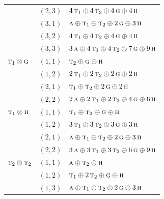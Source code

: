 \documentclass[11pt]{article}
\newcommand{\irr}[1]{\text{\normalfont\scshape #1}}
\begin{document}
\begin{longtable}{p{} c p{}}
 & $(2,3)$ & $4\,\irr{t}_{1}\oplus 4\,\irr{t}_{2}\oplus 4\,\irr{g}\oplus 4\,\irr{h}$\\

 & $(3,1)$ & $\irr{a}\oplus \irr{t}_{1}\oplus \irr{t}_{2}\oplus 2\,\irr{g}\oplus 3\,\irr{h}$\\

 & $(3,2)$ & $4\,\irr{t}_{1}\oplus 4\,\irr{t}_{2}\oplus 4\,\irr{g}\oplus 4\,\irr{h}$\\

 & $(3,3)$ & $3\,\irr{a}\oplus 4\,\irr{t}_{1}\oplus 4\,\irr{t}_{2}\oplus 7\,\irr{g}\oplus 9\,\irr{h}$\\

\hline

$\irr{t}_{1}\otimes \irr{g}$ & $(1,1)$ & $\irr{t}_{2}\oplus \irr{g}\oplus \irr{h}$\\

 & $(1,2)$ & $2\,\irr{t}_{1}\oplus 2\,\irr{t}_{2}\oplus 2\,\irr{g}\oplus 2\,\irr{h}$\\

 & $(2,1)$ & $\irr{t}_{1}\oplus \irr{t}_{2}\oplus 2\,\irr{g}\oplus 2\,\irr{h}$\\

 & $(2,2)$ & $2\,\irr{a}\oplus 2\,\irr{t}_{1}\oplus 2\,\irr{t}_{2}\oplus 4\,\irr{g}\oplus 6\,\irr{h}$\\

\hline

$\irr{t}_{1}\otimes \irr{h}$ & $(1,1)$ & $\irr{t}_{1}\oplus \irr{t}_{2}\oplus \irr{g}\oplus \irr{h}$\\

 & $(1,2)$ & $3\,\irr{t}_{1}\oplus 3\,\irr{t}_{2}\oplus 3\,\irr{g}\oplus 3\,\irr{h}$\\

 & $(2,1)$ & $\irr{a}\oplus \irr{t}_{1}\oplus \irr{t}_{2}\oplus 2\,\irr{g}\oplus 3\,\irr{h}$\\

 & $(2,2)$ & $3\,\irr{a}\oplus 3\,\irr{t}_{1}\oplus 3\,\irr{t}_{2}\oplus 6\,\irr{g}\oplus 9\,\irr{h}$\\

\hline

$\irr{t}_{2}\otimes \irr{t}_{2}$ & $(1,1)$ & $\irr{a}\oplus \irr{t}_{2}\oplus \irr{h}$\\

 & $(1,2)$ & $\irr{t}_{1}\oplus 2\,\irr{t}_{2}\oplus \irr{g}\oplus \irr{h}$\\

 & $(1,3)$ & $\irr{a}\oplus \irr{t}_{1}\oplus \irr{t}_{2}\oplus 2\,\irr{g}\oplus 3\,\irr{h}$\\


\end{longtable}
\end{document}
